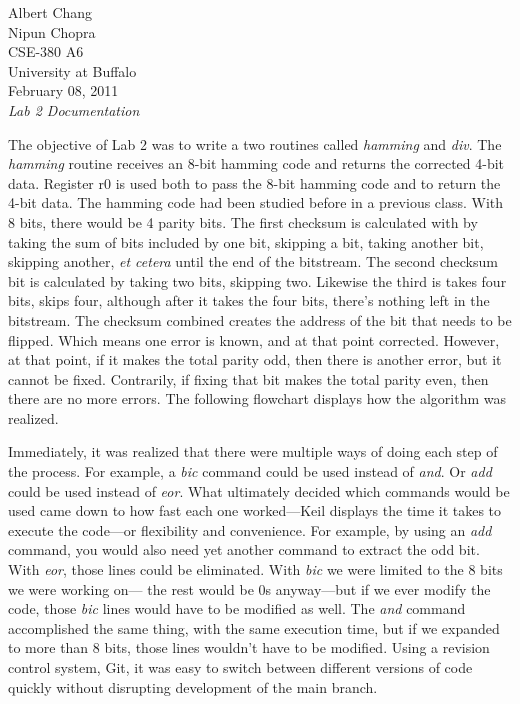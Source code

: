 \documentclass[letterpaper,10pt]{article}
\begin{document}
    Albert Chang\\
    Nipun Chopra\\
    CSE-380 A6\\
    University at Buffalo\\
    February 08, 2011\\
    \textit{Lab 2 Documentation}

    The objective of Lab 2 was to write a two routines called \textit{hamming}
    and \textit{div}. The \textit{hamming} routine receives an 8-bit hamming
    code and returns the corrected 4-bit data. Register r0 is used both to
    pass the 8-bit hamming code and to return the 4-bit data. The hamming
    code had been studied before in a previous class. With 8 bits, there would
    be 4 parity bits. The first checksum is calculated with by taking the
    sum of bits included by one bit, skipping a bit, taking another bit,
    skipping another, \textit{et cetera} until the end of the bitstream. The
    second checksum bit is calculated by taking two bits, skipping two.
    Likewise the third is takes four bits, skips four, although after it takes
    the four bits, there's nothing left in the bitstream. The checksum combined
    creates the address of the bit that needs to be flipped. Which means one
    error is known, and at that point corrected. However, at that point, if
    it makes the total parity odd, then there is another error, but it cannot
    be fixed. Contrarily, if fixing that bit makes the total parity even, then
    there are no more errors. The following flowchart displays how the
    algorithm was realized.

    Immediately, it was realized that there were multiple ways of doing each
    step of the process. For example, a \textit{bic} command could be used
    instead of \textit{and}. Or \textit{add} could be used instead of
    \textit{eor}. What ultimately decided which commands would be used came
    down to how fast each one worked---Keil displays the time it takes to
    execute the code---or flexibility and convenience. For example, by
    using an \textit{add} command, you would also need yet another command to
    extract the odd bit. With \textit{eor}, those lines could be eliminated.
    With \textit{bic} we were limited to the 8 bits we were working on---
    the rest would be 0s anyway---but if we ever modify the code, those
    \textit{bic} lines would have to be modified as well. The \textit{and}
    command accomplished the same thing, with the same execution time, but if
    we expanded to more than 8 bits, those lines wouldn't have to be modified.
    Using a revision control system, Git, it was easy to switch between
    different versions of code quickly without disrupting development of the
    main branch.
\end{document}
